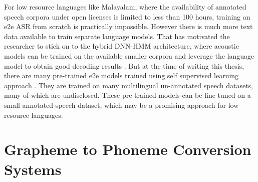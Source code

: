 
For low resource languages like Malayalam, where the availability of annotated speech corpora under open licenses is limited to less than 100 hours, training an \gls{e2e} ASR from scratch is practically impossible. However there is much more text data available to train separate language models. That has motivated the researcher to stick on to the hybrid DNN-HMM architecture, where acoustic models can be trained on the available smaller corpora and leverage the language model to obtain good decoding results \cite{SMIT2021101158}. But at the time of writing this thesis, there are many pre-trained \gls{e2e} models trained using self supervised learning approach \cite{baevski2021unsupervised,radford2022robust}. They are trained on many multilingual un-annotated speech datasets, many of which are undisclosed. These pre-trained models can be fine tuned on a small annotated speech dataset, which may be a promising approach for low resource languages. 







\section{Grapheme to Phoneme Conversion Systems} \label{sec:Literature-g2p}

